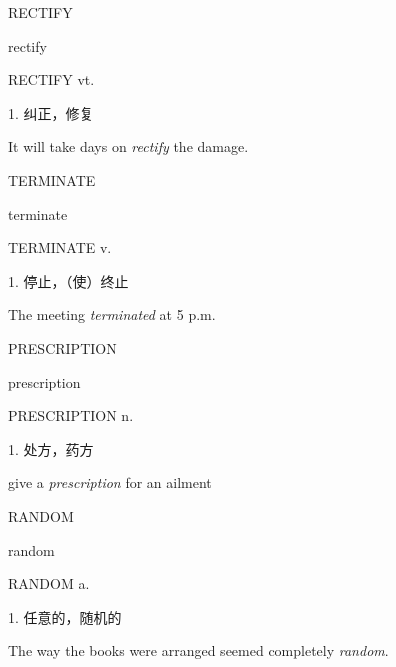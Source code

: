 \begin{flashcard}{
RECTIFY

rectify
}
\begin{center}
RECTIFY vt. 
\end{center}
1. 纠正，修复

It will take days on \textit{rectify} the damage.

\end{flashcard}
\begin{flashcard}{
TERMINATE

terminate
}
\begin{center}
TERMINATE v. 
\end{center}
1. 停止，（使）终止

The meeting \textit{terminated} at 5 p.m.

\end{flashcard}
\begin{flashcard}{
PRESCRIPTION

prescription
}
\begin{center}
PRESCRIPTION n. 
\end{center}
1. 处方，药方

give a \textit{prescription} for an ailment

\end{flashcard}
\begin{flashcard}{
RANDOM

random
}
\begin{center}
RANDOM a. 
\end{center}
1. 任意的，随机的

The way the books were arranged seemed completely \textit{random}.

\end{flashcard}
